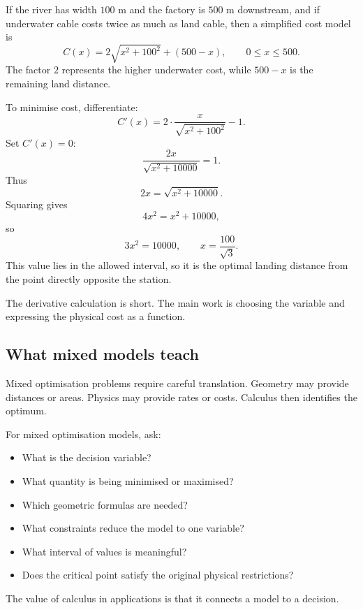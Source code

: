If the river has width \(100\) m and the factory is \(500\) m downstream, and if underwater cable costs twice as much as land cable, then a simplified cost model is
\[
C(x)=2\sqrt{x^2+100^2}+(500-x),
\qquad 0\le x\le500.
\]
The factor \(2\) represents the higher underwater cost, while \(500-x\) is the remaining land distance.

To minimise cost, differentiate:
\[
C'(x)=2\cdot\frac{x}{\sqrt{x^2+100^2}}-1.
\]
Set \(C'(x)=0\):
\[
\frac{2x}{\sqrt{x^2+10000}}=1.
\]
Thus
\[
2x=\sqrt{x^2+10000}.
\]
Squaring gives
\[
4x^2=x^2+10000,
\]
so
\[
3x^2=10000,
\qquad
x=\frac{100}{\sqrt3}.
\]
This value lies in the allowed interval, so it is the optimal landing distance from the point directly opposite the station.

\begin{remarkbox}
The derivative calculation is short. The main work is choosing the variable and expressing the physical cost as a function.
\end{remarkbox}

\subsection*{What mixed models teach}

Mixed optimisation problems require careful translation. Geometry may provide distances or areas. Physics may provide rates or costs. Calculus then identifies the optimum.

\begin{summarybox}
For mixed optimisation models, ask:
\begin{itemize}
\item What is the decision variable?
\item What quantity is being minimised or maximised?
\item Which geometric formulas are needed?
\item What constraints reduce the model to one variable?
\item What interval of values is meaningful?
\item Does the critical point satisfy the original physical restrictions?
\end{itemize}
\end{summarybox}

The value of calculus in applications is that it connects a model to a decision.